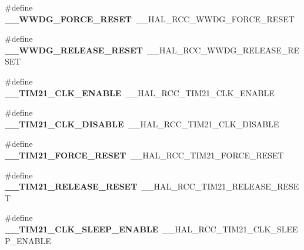 \begin{DoxyCompactItemize}
\#define {\bfseries \+\_\+\+\_\+\+W\+W\+D\+G\+\_\+\+F\+O\+R\+C\+E\+\_\+\+R\+E\+S\+ET}~\+\_\+\+\_\+\+H\+A\+L\+\_\+\+R\+C\+C\+\_\+\+W\+W\+D\+G\+\_\+\+F\+O\+R\+C\+E\+\_\+\+R\+E\+S\+ET
\item 
\mbox{\label{group___h_a_l___r_c_c___aliased_ga068a4fec4a2fd9ca223b4d28a0fbc6b8}} 
\#define {\bfseries \+\_\+\+\_\+\+W\+W\+D\+G\+\_\+\+R\+E\+L\+E\+A\+S\+E\+\_\+\+R\+E\+S\+ET}~\+\_\+\+\_\+\+H\+A\+L\+\_\+\+R\+C\+C\+\_\+\+W\+W\+D\+G\+\_\+\+R\+E\+L\+E\+A\+S\+E\+\_\+\+R\+E\+S\+ET
\item 
\mbox{\label{group___h_a_l___r_c_c___aliased_ga5e5f6e02491ba4544c8e5e788c9914f9}} 
\#define {\bfseries \+\_\+\+\_\+\+T\+I\+M21\+\_\+\+C\+L\+K\+\_\+\+E\+N\+A\+B\+LE}~\+\_\+\+\_\+\+H\+A\+L\+\_\+\+R\+C\+C\+\_\+\+T\+I\+M21\+\_\+\+C\+L\+K\+\_\+\+E\+N\+A\+B\+LE
\item 
\mbox{\label{group___h_a_l___r_c_c___aliased_ga73cc7df88569f682f8f5dafb8fa76fab}} 
\#define {\bfseries \+\_\+\+\_\+\+T\+I\+M21\+\_\+\+C\+L\+K\+\_\+\+D\+I\+S\+A\+B\+LE}~\+\_\+\+\_\+\+H\+A\+L\+\_\+\+R\+C\+C\+\_\+\+T\+I\+M21\+\_\+\+C\+L\+K\+\_\+\+D\+I\+S\+A\+B\+LE
\item 
\mbox{\label{group___h_a_l___r_c_c___aliased_ga6d2dbc31d955310a9360e55fe7748065}} 
\#define {\bfseries \+\_\+\+\_\+\+T\+I\+M21\+\_\+\+F\+O\+R\+C\+E\+\_\+\+R\+E\+S\+ET}~\+\_\+\+\_\+\+H\+A\+L\+\_\+\+R\+C\+C\+\_\+\+T\+I\+M21\+\_\+\+F\+O\+R\+C\+E\+\_\+\+R\+E\+S\+ET
\item 
\mbox{\label{group___h_a_l___r_c_c___aliased_ga9058ce5ea35581c862efa9d0be0a991e}} 
\#define {\bfseries \+\_\+\+\_\+\+T\+I\+M21\+\_\+\+R\+E\+L\+E\+A\+S\+E\+\_\+\+R\+E\+S\+ET}~\+\_\+\+\_\+\+H\+A\+L\+\_\+\+R\+C\+C\+\_\+\+T\+I\+M21\+\_\+\+R\+E\+L\+E\+A\+S\+E\+\_\+\+R\+E\+S\+ET
\item 
\mbox{\label{group___h_a_l___r_c_c___aliased_ga92b381109bd6db49c8ad5a607ed3a99b}} 
\#define {\bfseries \+\_\+\+\_\+\+T\+I\+M21\+\_\+\+C\+L\+K\+\_\+\+S\+L\+E\+E\+P\+\_\+\+E\+N\+A\+B\+LE}~\+\_\+\+\_\+\+H\+A\+L\+\_\+\+R\+C\+C\+\_\+\+T\+I\+M21\+\_\+\+C\+L\+K\+\_\+\+S\+L\+E\+E\+P\+\_\+\+E\+N\+A\+B\+LE
\item 

\end{DoxyCompactItemize}
